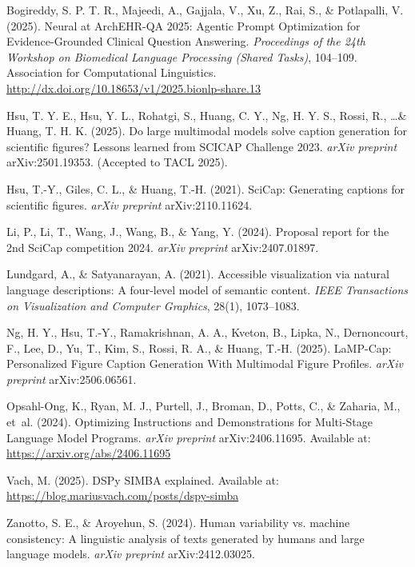 \documentclass{article} %
\begin{document}
\begin{thebibliography}{}

Bogireddy, S. P. T. R., Majeedi, A., Gajjala, V., Xu, Z., Rai, S., \& Potlapalli, V. (2025).
Neural at ArchEHR-QA 2025: Agentic Prompt Optimization for Evidence-Grounded Clinical Question Answering.
\textit{Proceedings of the 24th Workshop on Biomedical Language Processing (Shared Tasks)}, 104–109.
Association for Computational Linguistics.
\url{http://dx.doi.org/10.18653/v1/2025.bionlp-share.13}

Hsu, T. Y. E., Hsu, Y. L., Rohatgi, S., Huang, C. Y., Ng, H. Y. S., Rossi, R., \ldots \& Huang, T. H. K. (2025).
Do large multimodal models solve caption generation for scientific figures? Lessons learned from SCICAP Challenge 2023.
\textit{arXiv preprint} arXiv:2501.19353. (Accepted to TACL 2025).

Hsu, T.-Y., Giles, C. L., \& Huang, T.-H. (2021).
SciCap: Generating captions for scientific figures.
\textit{arXiv preprint} arXiv:2110.11624.

Li, P., Li, T., Wang, J., Wang, B., \& Yang, Y. (2024).
Proposal report for the 2nd SciCap competition 2024.
\textit{arXiv preprint} arXiv:2407.01897.

Lundgard, A., \& Satyanarayan, A. (2021).
Accessible visualization via natural language descriptions: A four-level model of semantic content.
\textit{IEEE Transactions on Visualization and Computer Graphics}, 28(1), 1073–1083.

Ng, H. Y., Hsu, T.-Y., Ramakrishnan, A. A., Kveton, B., Lipka, N., Dernoncourt, F., Lee, D., Yu, T., Kim, S., Rossi, R. A., \& Huang, T.-H. (2025).
LaMP-Cap: Personalized Figure Caption Generation With Multimodal Figure Profiles.
\textit{arXiv preprint} arXiv:2506.06561.

Opsahl-Ong, K., Ryan, M. J., Purtell, J., Broman, D., Potts, C., \& Zaharia, M., et~al. (2024).
Optimizing Instructions and Demonstrations for Multi-Stage Language Model Programs.
\textit{arXiv preprint} arXiv:2406.11695. Available at: \url{https://arxiv.org/abs/2406.11695}

Vach, M. (2025).
DSPy SIMBA explained.
Available at: \url{https://blog.mariusvach.com/posts/dspy-simba}

Zanotto, S. E., \& Aroyehun, S. (2024).
Human variability vs. machine consistency: A linguistic analysis of texts generated by humans and large language models.
\textit{arXiv preprint} arXiv:2412.03025.

\end{thebibliography}
\end{document}
